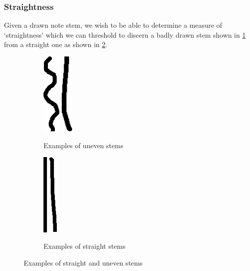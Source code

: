 \subsubsection{Straightness}\label{sec:scoring-stem-straightness}

Given a drawn note stem, we wish to be able to determine a measure of `straightness' which we can threshold to discern a badly drawn stem shown in \cref{fig:wonky-stems} from a straight one  as shown in \cref{fig:straight-stems}.

\begin{figure}[h!]
    \centering
    \begin{subfigure}[b]{.4\linewidth}
        \centering
        \includegraphics[height=4cm]{gfx/implementation/stem-straightness/4912.png}
        \quad
        \includegraphics[height=4cm]{gfx/implementation/stem-straightness/5371.png}
        \caption{Examples of uneven stems}
        \label{fig:wonky-stems}
    \end{subfigure}
    \begin{subfigure}[b]{.4\linewidth}
        \centering
        \includegraphics[height=4cm]{gfx/implementation/stem-straightness/3876.png}
        \quad
        \includegraphics[height=4cm]{gfx/implementation/stem-straightness/5104.png}
        \caption{Examples of straight stems}
        \label{fig:straight-stems}
    \end{subfigure}

    \caption{Examples of straight and uneven stems}
    \label{fig:stem-straightness-examples}
\end{figure}

